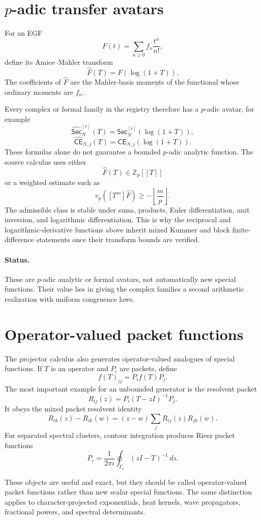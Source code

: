 \documentclass[11pt]{article}
\theoremstyle{definition}
\theoremstyle{remark}
\newcommand{\Sec}{\mathsf{Sec}}
\newcommand{\CE}{\mathsf{CE}}
\newcommand{\Z}{\mathbb Z}
\begin{document}
\section{\texorpdfstring{$p$-adic transfer avatars}{p-adic transfer avatars}}

For an EGF
\[
F(t)=\sum_{n\ge0}f_n\frac{t^n}{n!},
\]
define its Amice--Mahler transform
\[
\boxed{
\widehat F(T)=F(\log(1+T)).
}
\]
The coefficients of $\widehat F$ are the Mahler-basis moments of the functional whose ordinary moments are $f_n$.

Every complex or formal family in the registry therefore has a $p$-adic avatar, for example
\[
\widehat{\Sec}_{N}^{[r]}(T)
=\Sec_N^{[r]}(\log(1+T)),
\]
\[
\widehat{\CE}_{N,j}(T)
=\CE_{N,j}(\log(1+T)).
\]
These formulas alone do not guarantee a bounded $p$-adic analytic function.  The source calculus uses either
\[
\widehat F(T)\in\Z_p[[T]]
\]
or a weighted estimate such as
\[
v_p([T^m]\widehat F)\ge-\left\lfloor\frac mp\right\rfloor.
\]
The admissible class is stable under sums, products, Euler differentiation, unit inversion, and logarithmic differentiation.  This is why the reciprocal and logarithmic-derivative functions above inherit mixed Kummer and block finite-difference statements once their transform bounds are verified.

\paragraph{Status.}
These are $p$-adic analytic or formal avatars, not automatically new special functions.  Their value lies in giving the complex families a second arithmetic realization with uniform congruence laws.

\section{Operator-valued packet functions}

The projector calculus also generates operator-valued analogues of special functions.  If $T$ is an operator and $P_i$ are packets, define
\[
f(T)_{ij}=P_i f(T)P_j.
\]
The most important example for an unbounded generator is the resolvent packet
\[
\boxed{
R_{ij}(z)=P_i(T-zI)^{-1}P_j.
}
\]
It obeys the mixed packet resolvent identity
\[
R_{ik}(z)-R_{ik}(w)
=(z-w)\sum_jR_{ij}(z)R_{jk}(w).
\]
For separated spectral clusters, contour integration produces Riesz packet functions
\[
P_r=\frac1{2\pi i}\oint_{\Gamma_r}(zI-T)^{-1}\,dz.
\]

These objects are useful and exact, but they should be called operator-valued packet functions rather than new scalar special functions.  The same distinction applies to character-projected exponentials, heat kernels, wave propagators, fractional powers, and spectral determinants.
\end{document}
